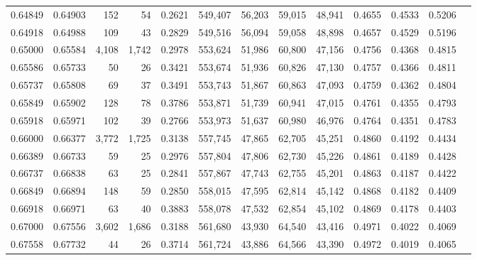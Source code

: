 \begin{tabular}{rrrrrrrrrrrrr}
0.64849 & 0.64903 &    152 &    54 &                                     0.2621 & 549,407 &  56,203 &  59,015 &  48,941 & 0.4655 & 0.4533 & 0.5206 \\
0.64918 & 0.64988 &    109 &    43 &                                     0.2829 & 549,516 &  56,094 &  59,058 &  48,898 & 0.4657 & 0.4529 & 0.5196 \\
0.65000 & 0.65584 &  4,108 & 1,742 &                                     0.2978 & 553,624 &  51,986 &  60,800 &  47,156 & 0.4756 & 0.4368 & 0.4815 \\
0.65586 & 0.65733 &     50 &    26 &                                     0.3421 & 553,674 &  51,936 &  60,826 &  47,130 & 0.4757 & 0.4366 & 0.4811 \\
0.65737 & 0.65808 &     69 &    37 &                                     0.3491 & 553,743 &  51,867 &  60,863 &  47,093 & 0.4759 & 0.4362 & 0.4804 \\
0.65849 & 0.65902 &    128 &    78 &                                     0.3786 & 553,871 &  51,739 &  60,941 &  47,015 & 0.4761 & 0.4355 & 0.4793 \\
0.65918 & 0.65971 &    102 &    39 &                                     0.2766 & 553,973 &  51,637 &  60,980 &  46,976 & 0.4764 & 0.4351 & 0.4783 \\
0.66000 & 0.66377 &  3,772 & 1,725 &                                     0.3138 & 557,745 &  47,865 &  62,705 &  45,251 & 0.4860 & 0.4192 & 0.4434 \\
0.66389 & 0.66733 &     59 &    25 &                                     0.2976 & 557,804 &  47,806 &  62,730 &  45,226 & 0.4861 & 0.4189 & 0.4428 \\
0.66737 & 0.66838 &     63 &    25 &                                     0.2841 & 557,867 &  47,743 &  62,755 &  45,201 & 0.4863 & 0.4187 & 0.4422 \\
0.66849 & 0.66894 &    148 &    59 &                                     0.2850 & 558,015 &  47,595 &  62,814 &  45,142 & 0.4868 & 0.4182 & 0.4409 \\
0.66918 & 0.66971 &     63 &    40 &                                     0.3883 & 558,078 &  47,532 &  62,854 &  45,102 & 0.4869 & 0.4178 & 0.4403 \\
0.67000 & 0.67556 &  3,602 & 1,686 &                                     0.3188 & 561,680 &  43,930 &  64,540 &  43,416 & 0.4971 & 0.4022 & 0.4069 \\
0.67558 & 0.67732 &     44 &    26 &                                     0.3714 & 561,724 &  43,886 &  64,566 &  43,390 & 0.4972 & 0.4019 & 0.4065 \\

\end{tabular}
